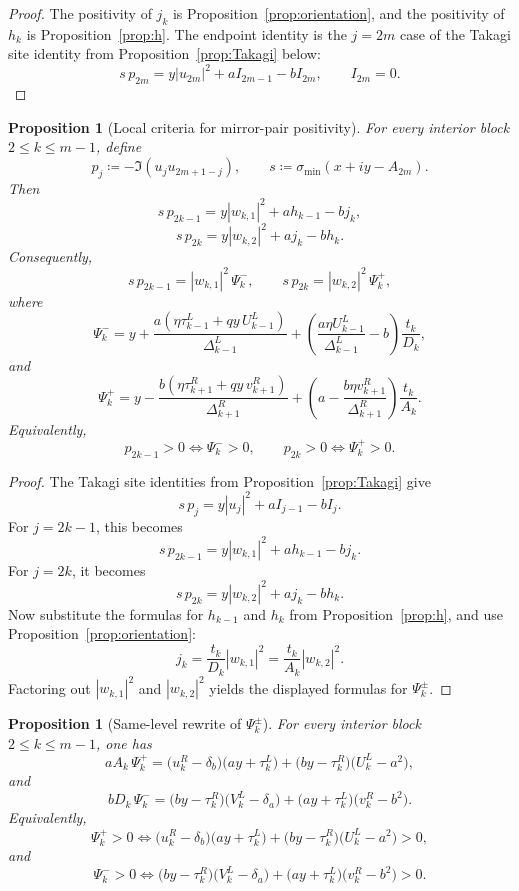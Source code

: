 \documentclass[11pt]{article}
\newtheorem{proposition}[theorem]{Proposition}
\begin{document}
\begin{proof}
The positivity of \(j_k\) is Proposition~\ref{prop:orientation}, and the positivity of \(h_k\) is
Proposition~\ref{prop:h}. The endpoint identity is the \(j=2m\) case of the Takagi site
identity from Proposition~\ref{prop:Takagi} below:
\[
s\,p_{2m}=y|u_{2m}|^2+aI_{2m-1}-bI_{2m},
\qquad
I_{2m}=0.
\]
\end{proof}

\begin{proposition}[Local criteria for mirror-pair positivity]\label{prop:localcriteria}
For every interior block \(2\le k\le m-1\), define
\[
p_j\coloneqq -\Im(u_j u_{2m+1-j}),
\qquad
s\coloneqq \sigma_{\min}(x+iy-A_{2m}).
\]
Then
\[
s\,p_{2k-1}
=
y|w_{k,1}|^2+a h_{k-1}-b j_k,
\]
\[
s\,p_{2k}
=
y|w_{k,2}|^2+a j_k-b h_k.
\]
Consequently,
\[
s\,p_{2k-1}=|w_{k,1}|^2\,\Psi_k^-,
\qquad
s\,p_{2k}=|w_{k,2}|^2\,\Psi_k^+,
\]
where
\[
\Psi_k^-
=
y
+
\frac{a(\eta\tau_{k-1}^L+qy\,U_{k-1}^L)}{\Delta_{k-1}^L}
+
\left(
\frac{a\eta U_{k-1}^L}{\Delta_{k-1}^L}-b
\right)\frac{t_k}{D_k},
\]
and
\[
\Psi_k^+
=
y
-
\frac{b(\eta\tau_{k+1}^R+qy\,v_{k+1}^R)}{\Delta_{k+1}^R}
+
\left(
a-\frac{b\eta v_{k+1}^R}{\Delta_{k+1}^R}
\right)\frac{t_k}{A_k}.
\]
Equivalently,
\[
p_{2k-1}>0 \iff \Psi_k^- >0,
\qquad
p_{2k}>0 \iff \Psi_k^+ >0.
\]
\end{proposition}

\begin{proof}
The Takagi site identities from Proposition~\ref{prop:Takagi} give
\[
s\,p_j
=
y|u_j|^2+a I_{j-1}-b I_j.
\]
For \(j=2k-1\), this becomes
\[
s\,p_{2k-1}
=
y|w_{k,1}|^2+a h_{k-1}-b j_k.
\]
For \(j=2k\), it becomes
\[
s\,p_{2k}
=
y|w_{k,2}|^2+a j_k-b h_k.
\]
Now substitute the formulas for \(h_{k-1}\) and \(h_k\) from Proposition~\ref{prop:h}, and use
Proposition~\ref{prop:orientation}:
\[
j_k=\frac{t_k}{D_k}|w_{k,1}|^2=\frac{t_k}{A_k}|w_{k,2}|^2.
\]
Factoring out \(|w_{k,1}|^2\) and \(|w_{k,2}|^2\) yields the displayed formulas for
\(\Psi_k^\pm\).
\end{proof}

\begin{proposition}[Same-level rewrite of \(\Psi_k^\pm\)]\label{prop:samelevel}
For every interior block \(2\le k\le m-1\), one has
\[
aA_k\,\Psi_k^+
=
\bigl(u_k^R-\delta_b\bigr)\bigl(ay+\tau_k^L\bigr)
+
\bigl(by-\tau_k^R\bigr)\bigl(U_k^L-a^2\bigr),
\]
and
\[
bD_k\,\Psi_k^-
=
\bigl(by-\tau_k^R\bigr)\bigl(V_k^L-\delta_a\bigr)
+
\bigl(ay+\tau_k^L\bigr)\bigl(v_k^R-b^2\bigr).
\]
Equivalently,
\[
\Psi_k^+>0
\iff
\bigl(u_k^R-\delta_b\bigr)\bigl(ay+\tau_k^L\bigr)
+
\bigl(by-\tau_k^R\bigr)\bigl(U_k^L-a^2\bigr)>0,
\]
and
\[
\Psi_k^->0
\iff
\bigl(by-\tau_k^R\bigr)\bigl(V_k^L-\delta_a\bigr)
+
\bigl(ay+\tau_k^L\bigr)\bigl(v_k^R-b^2\bigr)>0.
\]
\end{proposition}
\end{document}
